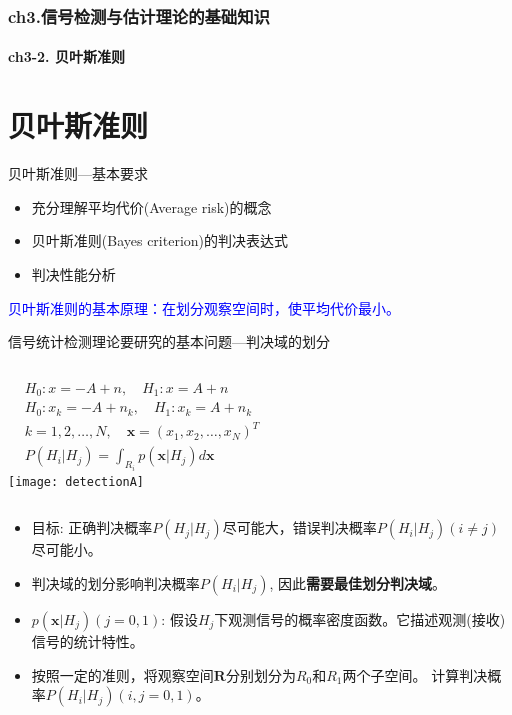 \begin{frame}[shrink]
  \frametitle{ch3.信号检测与估计理论的基础知识}
  \framesubtitle{ch3-2. 贝叶斯准则}
  \tableofcontents[hideallsubsections]
\end{frame}

\section{贝叶斯准则}

\begin{frame}{贝叶斯准则---基本要求}
\begin{itemize}
	\item 充分理解平均代价(Average risk)的概念
	\item 贝叶斯准则(Bayes criterion)的判决表达式
	\item 判决性能分析
\end{itemize}

\bigskip
\textcolor{blue}{贝叶斯准则的基本原理：在划分观察空间时，使平均代价最小。}
\end{frame}

\begin{frame}{信号统计检测理论要研究的基本问题---判决域的划分}
\begin{columns}
	\begin{align*}
	&H_0: x=-A+n,\quad H_1: x=A+n\\
	&H_0: x_k=-A+n_k,\quad H_1: x_k=A+n_k\\
	&k=1,2,\dots,N,\quad \bm{x}=(x_1,x_2,\dots,x_N)^{T}\\
	&P(H_i|H_j)=\int_{R_i}p(\bm{x}|H_j)d\bm{x}
	\end{align*}
	\texttt{[image: detectionA]}
\end{columns}
\begin{itemize}
	\item 目标: 正确判决概率$P(H_j|H_j)$尽可能大，错误判决概率$P(H_i|H_j)(i\ne j)$尽可能小。
	\item 判决域的划分影响判决概率$P(H_i|H_j)$, 因此\textbf{需要最佳划分判决域}。
	\item $p(\bm{x}|H_j)(j=0,1)$: 假设$H_j$下观测信号的概率密度函数。它描述观测(接收)信号的统计特性。
	\item 按照一定的准则，将观察空间$\bm{R}$分别划分为$R_0$和$R_1$两个子空间。
	计算判决概率$P(H_i|H_j)(i,j=0,1)$。	
\end{itemize}
\end{frame}

